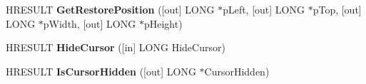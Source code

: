 \begin{DoxyCompactItemize}
\item 
\mbox{\label{interface_quartz_type_lib_1_1_i_video_window_a0b74685c2f38fc85bda45882f6fd3d69}} 
H\+R\+E\+S\+U\+LT {\bfseries Get\+Restore\+Position} (\mbox{[}out\mbox{]} L\+O\+NG $\ast$p\+Left, \mbox{[}out\mbox{]} L\+O\+NG $\ast$p\+Top, \mbox{[}out\mbox{]} L\+O\+NG $\ast$p\+Width, \mbox{[}out\mbox{]} L\+O\+NG $\ast$p\+Height)
\item 
\mbox{\label{interface_quartz_type_lib_1_1_i_video_window_a4387c24dff41013d14c05b678c2f964a}} 
H\+R\+E\+S\+U\+LT {\bfseries Hide\+Cursor} (\mbox{[}in\mbox{]} L\+O\+NG Hide\+Cursor)
\item 
\mbox{\label{interface_quartz_type_lib_1_1_i_video_window_a53037af197cbc994f5f7f8f5470ff7f1}} 
H\+R\+E\+S\+U\+LT {\bfseries Is\+Cursor\+Hidden} (\mbox{[}out\mbox{]} L\+O\+NG $\ast$Cursor\+Hidden)
\end{DoxyCompactItemize}
